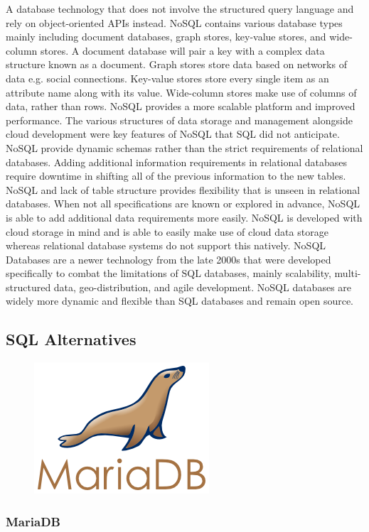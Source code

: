 \documentclass[12pt]{article}
\begin{document}
A database technology that does not involve the structured query language and rely on object-oriented APIs instead.  NoSQL contains various database types mainly including document databases, graph stores, key-value stores, and wide-column stores.  A document database will pair a key with a complex data structure known as a document.  Graph stores store data based on networks of data e.g. social connections.  Key-value stores store every single item as an attribute name along with its value.  Wide-column stores make use of columns of data, rather than rows.  NoSQL provides a more scalable platform and improved performance.  The various structures of data storage and management alongside cloud development were key features of NoSQL that SQL did not anticipate.
NoSQL provide dynamic schemas rather than the strict requirements of relational databases.  Adding additional information requirements in relational databases require downtime in shifting all of the previous information to the new tables.  NoSQL and lack of table structure provides flexibility that is unseen in relational databases.  When not all specifications are known or explored in advance, NoSQL is able to add additional data requirements more easily.  NoSQL is developed with cloud storage in mind and is able to easily make use of cloud data storage whereas relational database systems do not support this natively.
NoSQL Databases are a newer technology from the late 2000s that were developed specifically to combat the limitations of SQL databases, mainly scalability, multi-structured data, geo-distribution, and agile development.  NoSQL databases are widely more dynamic and flexible than SQL databases and remain open source.

\subsection{SQL Alternatives}

\begin{figure}[h]
	\centering
	\includegraphics[width=0.251\linewidth]{mariadb}
\end{figure}

\subsubsection{MariaDB}
\end{document}
